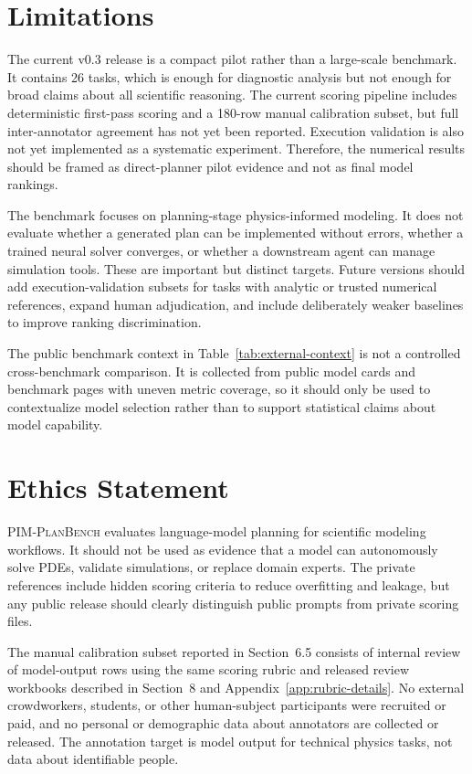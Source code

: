\documentclass[11pt]{article}
\newcommand{\pimplanbench}{\textsc{PIM-PlanBench}}
\begin{document}
\section*{Limitations}

The current v0.3 release is a compact pilot rather than a large-scale benchmark. It contains 26 tasks, which is enough for diagnostic analysis but not enough for broad claims about all scientific reasoning. The current scoring pipeline includes deterministic first-pass scoring and a 180-row manual calibration subset, but full inter-annotator agreement has not yet been reported. Execution validation is also not yet implemented as a systematic experiment. Therefore, the numerical results should be framed as direct-planner pilot evidence and not as final model rankings.

The benchmark focuses on planning-stage physics-informed modeling. It does not evaluate whether a generated plan can be implemented without errors, whether a trained neural solver converges, or whether a downstream agent can manage simulation tools. These are important but distinct targets. Future versions should add execution-validation subsets for tasks with analytic or trusted numerical references, expand human adjudication, and include deliberately weaker baselines to improve ranking discrimination.

The public benchmark context in Table~\ref{tab:external-context} is not a controlled cross-benchmark comparison. It is collected from public model cards and benchmark pages with uneven metric coverage, so it should only be used to contextualize model selection rather than to support statistical claims about model capability.

\section*{Ethics Statement}

\pimplanbench{} evaluates language-model planning for scientific modeling workflows. It should not be used as evidence that a model can autonomously solve PDEs, validate simulations, or replace domain experts. The private references include hidden scoring criteria to reduce overfitting and leakage, but any public release should clearly distinguish public prompts from private scoring files.

The manual calibration subset reported in Section~6.5 consists of internal review of model-output rows using the same scoring rubric and released review workbooks described in Section~8 and Appendix~\ref{app:rubric-details}. No external crowdworkers, students, or other human-subject participants were recruited or paid, and no personal or demographic data about annotators are collected or released. The annotation target is model output for technical physics tasks, not data about identifiable people.
\end{document}
